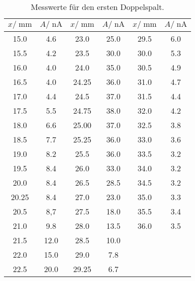 \begin{table}
  \centering
  \caption{Messwerte für den ersten Doppelspalt.}
   \begin{tabular}{S S| S S | S S}
    \toprule
    $x/\; \si{\mm}$& $A/\;\si{\nA}$ &
    $x/\; \si{\mm}$& $A/\;\si{\nA}$ &
    $x/\; \si{\mm}$& $A/\;\si{\nA}$ \\
    \midrule

    15.0& 4.6& 23.0& 25.0& 29.5& 6.0\\
    15.5& 4.2& 23.5& 30.0& 30.0& 5.3\\
    16.0& 4.0& 24.0& 35.0& 30.5& 4.9\\
    16.5& 4.0& 24.25& 36.0& 31.0& 4.7\\
    17.0& 4.4& 24.5& 37.0& 31.5& 4.4\\
    17.5& 5.5& 24.75& 38.0& 32.0& 4.2\\
    18.0& 6.6& 25.00& 37.0& 32.5& 3.8\\
    18.5& 7.7& 25.25& 36.0& 33.0& 3.6\\
    19.0& 8.2& 25.5& 36.0& 33.5& 3.2\\
    19.5& 8.4& 26.0& 33.0& 34.0& 3.2\\
    20.0& 8.4& 26.5& 28.5& 34.5& 3.2\\
    20.25& 8.4& 27.0& 23.0& 35.0& 3.3\\
    20.5& 8,7& 27.5& 18.0& 35.5& 3.4\\
    21.0& 9.8& 28.0& 13.5& 36.0& 3.5\\
    21.5& 12.0& 28.5& 10.0\\
    22.0& 15.0& 29.0& 7.8\\
    22.5& 20.0& 29.25& 6.7\\


   \bottomrule
  \end{tabular}
  \label{tab:tabelle3}
\end{table}
